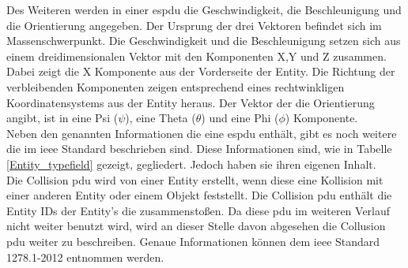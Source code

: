 Des Weiteren werden in einer \ac{espdu}  die Geschwindigkeit, die Beschleunigung und die Orientierung angegeben. Der Ursprung der drei Vektoren befindet sich im Massenschwerpunkt. Die Geschwindigkeit und die Beschleunigung setzen sich aus einem  dreidimensionalen Vektor mit den Komponenten X,Y und Z zusammen. Dabei zeigt die X Komponente aus der Vorderseite der Entity. Die Richtung der verbleibenden Komponenten zeigen entsprechend eines rechtwinkligen Koordinatensystems aus der Entity heraus. Der Vektor der die Orientierung angibt, ist in eine Psi ($\psi$), eine Theta ($\theta$)  und eine Phi ($\phi$) Komponente. \\
Neben den genannten Informationen die eine  \ac{espdu} enthält, gibt es noch weitere die im \ac{ieee} Standard beschrieben sind. Diese Informationen sind, wie in Tabelle \ref{Entity_typefield} gezeigt, gegliedert. Jedoch haben sie ihren eigenen Inhalt.
\\
Die Collision \ac{pdu} wird von einer Entity erstellt, wenn diese eine Kollision mit einer anderen Entity oder einem Objekt feststellt. Die Collision \ac{pdu} enthält die Entity IDs der Entity's die zusammenstoßen. Da diese \ac{pdu} im weiteren Verlauf nicht weiter benutzt wird, wird an dieser Stelle davon abgesehen die Collusion \ac{pdu} weiter zu beschreiben. Genaue Informationen können dem \glqq \ac{ieee} Standard 1278.1-2012\grqq{}  \cite{SISOStandardsActivityCommitteeoftheIEEEComputerSociety.} entnommen werden.
\\ 
\cite{MarkMcCall.}
\cite{SISOStandardsActivityCommitteeoftheIEEEComputerSociety.}
\cite{Brann.}
\newpage
